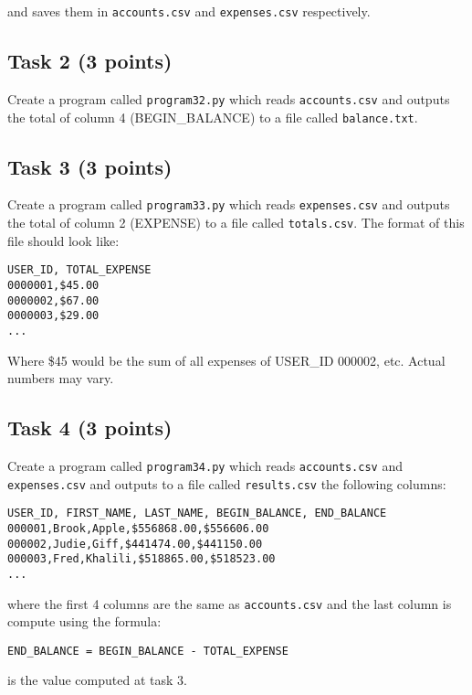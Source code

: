 \documentclass[12pt]{article}
\begin{document}
\noindent  and saves them in {\tt accounts.csv} and {\tt expenses.csv} respectively.

\subsection{Task 2 (3 points)}

Create a program called {\tt program32.py} which reads {\tt accounts.csv} and outputs the total of column 4 (BEGIN\_BALANCE) to a file called {\tt balance.txt}.

\subsection{Task 3 (3 points)}

\noindent Create a program called	{\tt program33.py} which reads {\tt expenses.csv} and outputs the	total of column 2 (EXPENSE) to a file called {\tt totals.csv}. The format of this file should look like:
\begin{verbatim}
USER_ID, TOTAL_EXPENSE
0000001,$45.00
0000002,$67.00
0000003,$29.00
...
\end{verbatim}

\noindent Where \$45 would be the sum of all expenses of USER\_ID 000002, etc. Actual numbers may vary.

\subsection{Task 4 (3 points)}

\noindent  Create a program called	{\tt program34.py} which reads {\tt accounts.csv} and {\tt expenses.csv} and outputs to a file called {\tt results.csv} the following columns:
\begin{verbatim}
USER_ID, FIRST_NAME, LAST_NAME, BEGIN_BALANCE, END_BALANCE
000001,Brook,Apple,$556868.00,$556606.00
000002,Judie,Giff,$441474.00,$441150.00
000003,Fred,Khalili,$518865.00,$518523.00
...
\end{verbatim}

\noindent where the first 4 columns are the same as {\tt accounts.csv} and the last column is compute using the formula:

\begin{verbatim}
END_BALANCE = BEGIN_BALANCE - TOTAL_EXPENSE
\end{verbatim}

 is the value computed at task 3.
\end{document}
